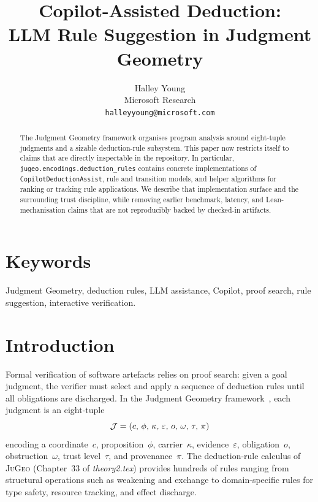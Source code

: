 \documentclass[11pt]{article}
\title{\textbf{Copilot-Assisted Deduction:\\
       LLM Rule Suggestion in Judgment Geometry}}
\author{Halley Young \\
  Microsoft Research \\
  \texttt{halleyyoung@microsoft.com}}
\date{}
\newcommand{\JG}{\textsc{JuGeo}}
\begin{document}
\maketitle


\begin{abstract}
The Judgment Geometry framework organises program analysis around
eight-tuple judgments and a sizable deduction-rule subsystem.  This
paper now restricts itself to claims that are directly inspectable in
the repository.  In particular, \texttt{jugeo.encodings.deduction\_rules}
contains concrete implementations of \texttt{CopilotDeductionAssist},
rule and transition models, and helper algorithms for ranking or
tracking rule applications.  We describe that implementation surface and
the surrounding trust discipline, while removing earlier benchmark,
latency, and Lean-mechanisation claims that are not reproducibly backed
by checked-in artifacts.
\end{abstract}

\section*{Keywords}
Judgment Geometry, deduction rules, LLM assistance, Copilot,
proof search, rule suggestion, interactive verification.


\section{Introduction}\label{sec:intro}

Formal verification of software artefacts relies on proof search:
given a goal judgment, the verifier must select and apply a
sequence of deduction rules until all obligations are discharged.
In the Judgment Geometry framework~\cite{young2024jugeo}, each
judgment is an eight-tuple
\[
  \mathcal{J} = (c,\,\phi,\,\kappa,\,\varepsilon,\,o,\,\omega,\,\tau,\,\pi)
\]
encoding a coordinate~$c$, proposition~$\phi$, carrier~$\kappa$,
evidence~$\varepsilon$, obligation~$o$, obstruction~$\omega$, trust
level~$\tau$, and provenance~$\pi$.  The deduction-rule calculus of
\JG{} (Chapter~33 of \emph{theory2.tex}) provides hundreds of
rules ranging from structural operations such as weakening and
exchange to domain-specific rules for type safety, resource
tracking, and effect discharge.
\end{document}

